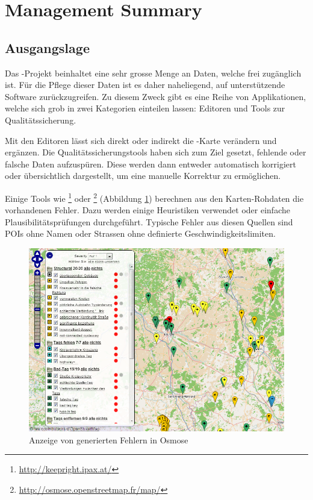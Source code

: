 \chapter*{Management Summary}
\thispagestyle{scrheadings}


\section*{Ausgangslage}
Das -Projekt beinhaltet eine sehr grosse Menge an Daten, welche frei zugänglich ist.
Für die Pflege dieser Daten ist es daher naheliegend, auf unterstützende Software zurückzugreifen.
Zu diesem Zweck gibt es eine Reihe von Applikationen, welche sich grob in zwei Kategorien einteilen lassen:
Editoren und Tools zur Qualitätssicherung.

Mit den Editoren lässt sich direkt oder indirekt die -Karte verändern und ergänzen.
Die Qualitätssicherungstools haben sich zum Ziel gesetzt, fehlende oder falsche Daten aufzuspüren.
Diese werden dann entweder automatisch korrigiert oder übersichtlich dargestellt, um eine manuelle Korrektur zu ermöglichen.

Einige Tools wie \footnote{\url{http://keepright.ipax.at/}} oder \footnote{\url{http://osmose.openstreetmap.fr/map/}} (Abbildung \ref{image-osmose-screenshot}) berechnen aus den Karten-Rohdaten die vorhandenen Fehler.
Dazu werden einige Heuristiken verwendet oder einfache Plausibilitätsprüfungen durchgeführt.
Typische Fehler aus diesen Quellen sind \glspl{POI} ohne Namen oder Strassen ohne definierte Geschwindigkeitslimiten.

\begin{figure}[H]
	\centering
	\includegraphics[scale=0.4]{images/managementsummary/osmose-screenshot}
	\caption{Anzeige von generierten Fehlern in Osmose}
	\label{image-osmose-screenshot}
\end{figure}

